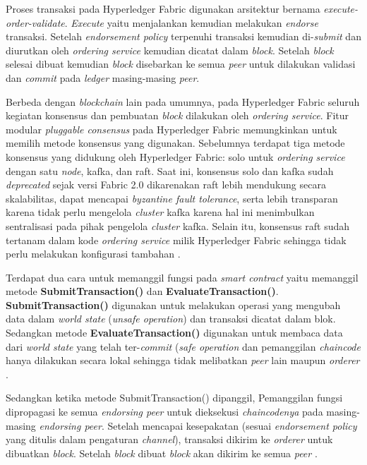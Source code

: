 Proses transaksi pada Hyperledger Fabric digunakan arsitektur bernama \textit{execute-order-validate}. \textit{Execute} yaitu menjalankan kemudian melakukan \textit{endorse} transaksi. Setelah \textit{endorsement policy} terpenuhi transaksi kemudian di-\textit{submit} dan diurutkan oleh \textit{ordering service} kemudian dicatat dalam \textit{block}. Setelah \textit{block} selesai dibuat kemudian \textit{block} disebarkan ke semua \textit{peer} untuk dilakukan validasi dan \textit{commit} pada \textit{ledger} masing-masing \textit{peer}.

Berbeda dengan \textit{blockchain} lain pada umumnya, pada Hyperledger Fabric seluruh kegiatan konsensus dan pembuatan \textit{block} dilakukan oleh \textit{ordering service}. Fitur modular \textit{pluggable consensus} pada Hyperledger Fabric memungkinkan untuk memilih metode konsensus yang digunakan. Sebelumnya terdapat tiga metode konsensus yang didukung oleh Hyperledger Fabric: solo untuk \textit{ordering service} dengan satu \textit{node}, kafka, dan raft. Saat ini, konsensus solo dan kafka sudah \textit{deprecated} sejak versi Fabric 2.0 dikarenakan raft lebih mendukung secara skalabilitas, dapat mencapai \textit{byzantine fault tolerance}, serta lebih transparan karena tidak perlu mengelola \textit{cluster} kafka karena hal ini menimbulkan sentralisasi pada pihak pengelola \textit{cluster} kafka. Selain itu, konsensus raft sudah tertanam dalam kode \textit{ordering service} milik Hyperledger Fabric sehingga tidak perlu melakukan konfigurasi tambahan \citep{Androulaki2018}. 

Terdapat dua cara untuk memanggil fungsi pada \textit{smart contract} yaitu memanggil metode \textbf{SubmitTransaction()} dan \textbf{EvaluateTransaction()}. \textbf{SubmitTransaction()} digunakan untuk melakukan operasi yang mengubah data dalam \textit{world state} (\textit{unsafe operation}) dan transaksi dicatat dalam blok. Sedangkan metode \textbf{EvaluateTransaction()} digunakan untuk membaca data dari \textit{world state} yang telah ter-\textit{commit} (\textit{safe operation} dan pemanggilan \textit{chaincode} hanya dilakukan secara lokal sehingga tidak melibatkan \textit{peer} lain maupun \textit{orderer} \citep{Androulaki2018}.

Sedangkan ketika metode SubmitTransaction() dipanggil, Pemanggilan fungsi dipropagasi ke semua \textit{endorsing peer} untuk dieksekusi \textit{chaincodenya} pada masing-masing \textit{endorsing peer}. Setelah mencapai kesepakatan (sesuai \textit{endorsement policy} yang ditulis dalam pengaturan \textit{channel}), transaksi dikirim ke \textit{orderer} untuk dibuatkan \textit{block}. Setelah \textit{block} dibuat \textit{block} akan dikirim ke semua \textit{peer} \citep{Androulaki2018}.


